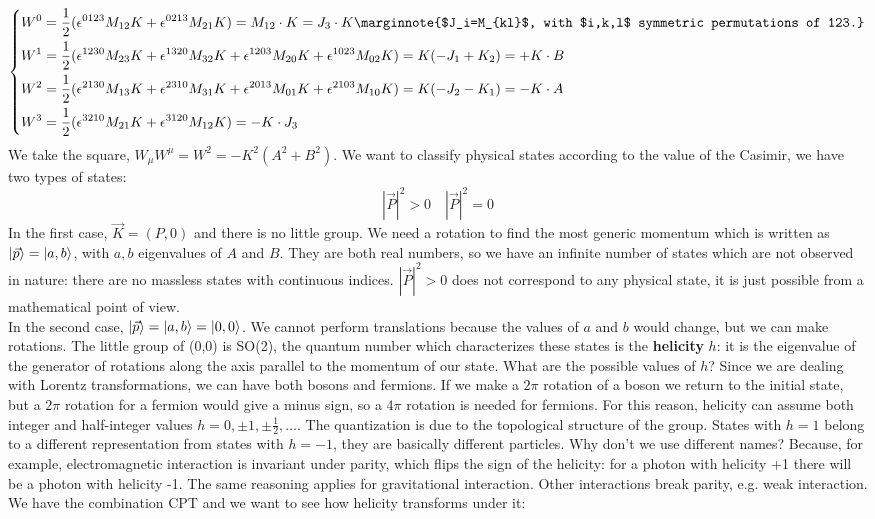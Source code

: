 \documentclass[../main.tex]{subfiles}
\begin{document}
\[
\left\{
\begin{aligned}
&W^0=\frac{1}{2}(\epsilon^{0123}M_{12}K+\epsilon^{0213}M_{21}K)=M_{12}\cdot K=J_3\cdot K\marginnote{$J_i=M_{kl}$, with $i,k,l$ symmetric permutations of 123.}\\
&W^1=\frac{1}{2}(\epsilon^{1230}M_{23}K+\epsilon^{1320}M_{32}K+\epsilon^{1203}M_{20}K+\epsilon^{1023}M_{02}K)=K(-J_1+K_2)=+K\cdot B\\
&W^2=\frac{1}{2}(\epsilon^{2130}M_{13}K+\epsilon^{2310}M_{31}K+\epsilon^{2013}M_{01}K+\epsilon^{2103}M_{10}K)=K(-J_2-K_1)=-K\cdot A\\
&W^3=\frac{1}{2}(\epsilon^{3210}M_{21}K+\epsilon^{3120}M_{12}K)=-K\cdot J_3
\end{aligned}
\right.
\]
We take the square, $W_\mu W^\mu=W^2=-K^2(A^2+B^2)$. We want to classify physical states according to the value of the Casimir, we have two types of states:
\[
|\vec{P}|^2>0 \quad |\vec{P}|^2=0
\]
In the first case, $\vec{K}=(P,0)$ and there is no little group. We need a rotation to find the most generic momentum which is written as $\ket{\vec{p}}=\ket{a,b}$, with $a,b$ eigenvalues of $A$ and $B$. They are both real numbers, so we have an infinite number of states which are not observed in nature: there are no massless states with continuous indices. $|\vec{P}|^2>0$ does not correspond to any physical state, it is just possible from a mathematical point of view.\\
In the second case, $\ket{\vec{p}}=\ket{a,b}=\ket{0,0}$. We cannot perform translations because the values of $a$ and $b$ would change, but we can make rotations. The little group of (0,0) is SO(2), the quantum number which characterizes these states is the \textbf{helicity} $h$: it is the eigenvalue of the generator of rotations along the axis parallel to the momentum of our state. What are the possible values of $h$? Since we are dealing with Lorentz transformations, we can have both bosons and fermions. If we make a $2\pi$ rotation of a boson we return to the initial state, but a $2\pi$ rotation for a fermion would give a minus sign, so a $4\pi$ rotation is needed for fermions. For this reason, helicity can assume both integer and half-integer values $h=0,\pm1,\pm\frac{1}{2},\dots$. The quantization is due to the topological structure of the group. States with $h=1$ belong to a different representation from states with $h=-1$, they are basically different particles. Why don't we use different names? Because, for example, electromagnetic interaction is invariant under parity, which flips the sign of the helicity: for a photon with helicity +1 there will be a photon with helicity -1. The same reasoning applies for gravitational interaction. Other interactions break parity, e.g. weak interaction. We have the combination CPT and we want to see how helicity transforms under it:
\end{document}
